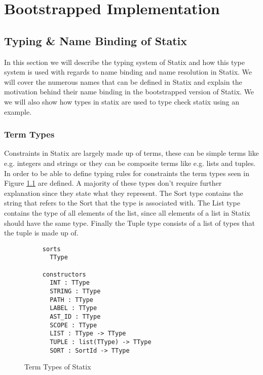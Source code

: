 
\chapter{\label{chap:implementation}Bootstrapped Implementation}

\section{Typing \& Name Binding of Statix}

In this section we will describe the typing system of Statix and how this type system is used with regards to name binding and name resolution in Statix. We will cover the numerous names that can be defined in Statix and explain the motivation behind their name binding in the bootstrapped version of Statix. We we will also show how types in statix are used to type check statix using an example.

\subsection{Term Types}

Constraints in Statix are largely made up of terms, these can be simple terms like e.g. integers and strings or they can be composite terms like e.g. lists and tuples. In order to be able to define typing rules for constraints the term types seen in Figure \ref{fig:term-types} are defined. A majority of these types don't require further explanation since they state what they represent. The Sort type contains the string that refers to the Sort that the type is associated with. The List type contains the type of all elements of the list, since all elements of a list in Statix should have the same type. Finally the Tuple type consists of a list of types that the tuple is made up of.

\begin{figure}
  \begin{lstlisting}
     sorts
       TType

     constructors
       INT : TType
       STRING : TType
       PATH : TType
       LABEL : TType
       AST_ID : TType
       SCOPE : TType
       LIST : TType -> TType
       TUPLE : list(TType) -> TType
       SORT : SortId -> TType
  \end{lstlisting}
  \caption{Term Types of Statix}
   \label{fig:term-types}
\end{figure}


